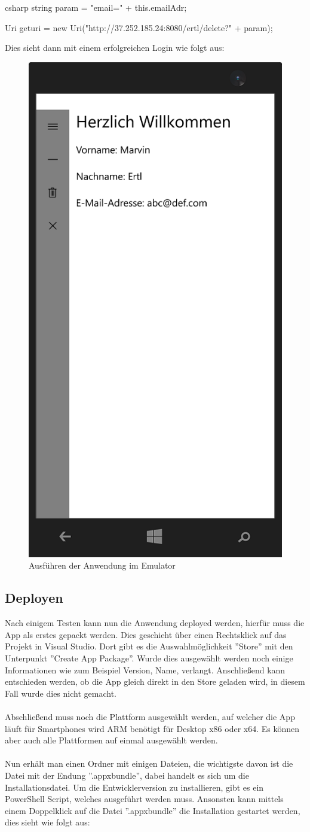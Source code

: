 \begin{code}{csharp}
	string param = "email=" + this.emailAdr;
	
	Uri geturi = new Uri("http://37.252.185.24:8080/ertl/delete?" + param);
\end{code}

Dies sieht dann mit einem erfolgreichen Login wie folgt aus:

\begin{figure}[H]
	\centering
	\includegraphics[width=0.3\linewidth]{images/screenshot006}
	\caption{Ausführen der Anwendung im Emulator}
	\label{fig:screenshot006}
\end{figure}


\subsection{Deployen}

Nach einigem Testen kann nun die Anwendung deployed werden, hierfür muss die App als erstes gepackt werden. Dies geschieht über einen Rechtsklick auf das Projekt in Visual Studio. Dort gibt es die Auswahlmöglichkeit ''Store'' mit den Unterpunkt ''Create App Package''. Wurde dies ausgewählt werden noch einige Informationen wie zum Beispiel Version, Name, verlangt. Anschließend kann entschieden werden, ob die App gleich direkt in den Store geladen wird, in diesem Fall wurde dies nicht gemacht.
\\\\
Abschließend muss noch die Plattform ausgewählt werden, auf welcher die App läuft für Smartphones wird ARM benötigt für Desktop x86 oder x64. Es können aber auch alle Plattformen auf einmal ausgewählt werden.
\\\\
Nun erhält man einen Ordner mit einigen Dateien, die wichtigste davon ist die Datei mit der Endung ''.appxbundle'', dabei handelt es sich um die Installationsdatei. \cite{packaging} Um die Entwicklerversion zu installieren, gibt es ein PowerShell Script, welches ausgeführt werden muss. Ansonsten kann mittels einem Doppelklick auf die Datei ''.appxbundle'' die Installation gestartet werden, dies sieht wie folgt aus: 

